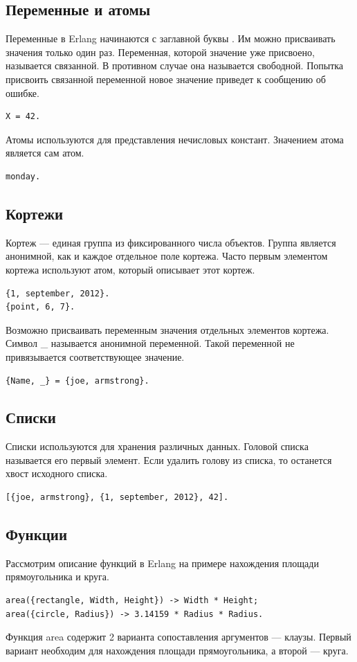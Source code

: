 		\subsection{Переменные и атомы} 
			Переменные в Erlang начинаются с заглавной буквы \cite{arm}. Им можно присваивать значения только один раз. 
			Переменная, которой значение уже присвоено, называется связанной. В противном случае она называется свободной. 
			Попытка присвоить связанной переменной новое значение приведет к сообщению об ошибке.
			\begin{lstlisting}
X = 42.
			\end{lstlisting}

			Атомы используются для представления нечисловых констант. Значением атома является сам атом.
			\begin{lstlisting}
monday.
			\end{lstlisting}  

		\subsection{Кортежи}
			Кортеж --- единая группа из фиксированного числа объектов. Группа является анонимной, как и каждое отдельное 
			поле кортежа. Часто первым элементом кортежа используют атом, который описывает этот кортеж.
			\begin{lstlisting}
{1, september, 2012}.
{point, 6, 7}.
			\end{lstlisting}
			
			Возможно присваивать переменным значения отдельных элементов кортежа. Символ \_ называется анонимной переменной. 
			Такой переменной не привязывается соответствующее значение.
			\begin{lstlisting}
{Name, _} = {joe, armstrong}.
			\end{lstlisting} 

		\subsection{Списки} 
			Списки используются для хранения различных данных. Головой списка называется его первый элемент. Если удалить 
			голову из списка, то останется хвост исходного списка.
			\begin{lstlisting}
[{joe, armstrong}, {1, september, 2012}, 42].
			\end{lstlisting}

		\subsection{Функции}
			Рассмотрим описание функций в Erlang на примере нахождения площади прямоугольника и круга.
			\begin{lstlisting}
area({rectangle, Width, Height}) -> Width * Height;
area({circle, Radius}) -> 3.14159 * Radius * Radius.
			\end{lstlisting}
			Функция area содержит 2 варианта сопоставления аргументов --- клаузы. Первый вариант необходим для нахождения 
			площади прямоугольника, а второй --- круга. 	
			
